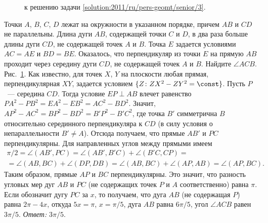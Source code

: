 \ifsolution
\begin{figure}\centering
    \caption{к решению задачи \ref{solution:2011/ru/pers-geomt/senior/3}.}
    \label{fig:solution:2011/ru/pers-geomt/senior/3}
\end{figure}
\fi %

\problem
Точки $A$, $B$, $C$, $D$ лежат на окружности в указанном порядке, причем $AB$ и
$CD$ не параллельны.
Длина дуги $AB$, содержащей точки $C$ и $D$, в два раза больше длины дуги $CD$,
не содержащей точек $A$ и $B$.
Точка $E$ задается условиями $AC = AE$ и $BD = BE$.
Оказалось, что перпендикуляр из точки $E$ на прямую $AB$ проходит через
середину дуги $CD$, не содержащей точек $A$ и $B$.
Найдите $\angle ACB$.
\solution
\label{solution:2011/ru/pers-geomt/senior/3}%
Рис.~\ref{fig:solution:2011/ru/pers-geomt/senior/3}.
Как известно, для точек $X$, $Y$ на плоскости любая прямая, перпендикулярная
$XY$, задается условием
$\{Z \colon ZX^2 - ZY^2 = \const\}$.
Пусть $P$~--- середина $CD$.
Тогда условие $EP \perp AB$ влечет равенство
$P A^2 - P B^2 = E A^2 - E B^2 = A C^2 - B D^2$.
Значит, $A P^2 - A C^2 = B P^2 - B D^2 = B' P^2 - B' C^2$, где точка $B'$
симметрична $B$ относительно серединного перпендикуляра к $CD$
(в силу условия о непараллельности $B' \neq A$).
Отсюда получаем, что прямые $AB'$ и $PC$ перпендикулярны.
Для направленных углов между прямыми имеем 
\begin{gather*}
    \pi / 2
=
    \angle (AB', PC)
=
    \angle (AB', B'C) + \angle (B'C, CP)
=\\=
    \angle (AB, BC) + \angle (DP, DB)
=
    \angle (AB, BC) + \angle (AP, AB)
=
    \angle (AP, BC)
.\end{gather*}
Таким образом, прямые $AP$ и $BC$ перпендикулярны.
Это значит, что разность угловых мер дуг $AB$ и $PC$
(не содержащих точек $P$ и $A$ соответственно) равна $\pi$.
Если обозначит дугу $PC$ за $x$, то получаем, что дуга $AB$
(не содержащая $P$) равна $2 \pi - 4 x$, откуда $5 x = \pi$, $x = \pi / 5$,
дуга $AB$ равна $6 \pi / 5$, угол $\angle ACB$ равен $3 \pi / 5$.
\emph{Ответ:} $3 \pi / 5$.
\endproblem
